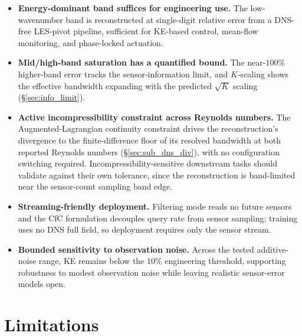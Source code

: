 \begin{itemize}
    \item \textbf{Energy-dominant band suffices for engineering use.} The low-wavenumber band is reconstructed at single-digit relative error from a DNS-free LES-pivot pipeline, sufficient for KE-based control, mean-flow monitoring, and phase-locked actuation.
    \item \textbf{Mid/high-band saturation has a quantified bound.} The near-$100\%$ higher-band error tracks the sensor-information limit, and $K$-scaling shows the effective bandwidth expanding with the predicted $\sqrt{K}$ scaling (\S\ref{sec:info_limit}).
    \item \textbf{Active incompressibility constraint across Reynolds numbers.} The Augmented-Lagrangian continuity constraint drives the reconstruction's divergence to the finite-difference floor of its resolved bandwidth at both reported Reynolds numbers (\S\ref{sec:sub_dns_div}), with no configuration switching required. Incompressibility-sensitive downstream tasks should validate against their own tolerance, since the reconstruction is band-limited near the sensor-count sampling band edge.
    \item \textbf{Streaming-friendly deployment.} Filtering mode reads no future sensors and the CfC formulation decouples query rate from sensor sampling; training uses no DNS full field, so deployment requires only the sensor stream.
    \item \textbf{Bounded sensitivity to observation noise.} Across the tested additive-noise range, KE remains below the $10\%$ engineering threshold, supporting robustness to modest observation noise while leaving realistic sensor-error models open.
\end{itemize}

\section{Limitations}
\label{sec:limitations}


